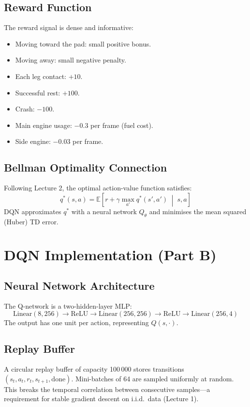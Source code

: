\documentclass[11pt,a4paper]{article}
\begin{document}
\subsection*{Reward Function}
The reward signal is dense and informative:
\begin{itemize}
  \item Moving toward the pad: small positive bonus.
  \item Moving away: small negative penalty.
  \item Each leg contact: $+10$.
  \item Successful rest: $+100$.
  \item Crash: $-100$.
  \item Main engine usage: $-0.3$ per frame (fuel cost).
  \item Side engine: $-0.03$ per frame.
\end{itemize}

\subsection*{Bellman Optimality Connection}
Following Lecture 2, the optimal action-value function satisfies:
\[
  q^*(s,a) = \mathbb{E}\!\left[r + \gamma \max_{a'} q^*(s',a') \;\middle|\; s,a\right]
\]
DQN approximates $q^*$ with a neural network $Q_\theta$ and minimises
the mean squared (Huber) TD error.

\section{DQN Implementation (Part B)}

\subsection{Neural Network Architecture}
The Q-network is a two-hidden-layer MLP:
\[
  \text{Linear}(8,256) \to \text{ReLU} \to \text{Linear}(256,256) \to
  \text{ReLU} \to \text{Linear}(256,4)
\]
The output has one unit per action, representing $Q(s,\cdot)$.

\subsection{Replay Buffer}
A circular replay buffer of capacity 100\,000 stores transitions
$(s_t,a_t,r_t,s_{t+1},\text{done})$.  Mini-batches of 64 are sampled
uniformly at random.  This breaks the temporal correlation between
consecutive samples—a requirement for stable gradient descent on
i.i.d.\ data (Lecture 1).
\end{document}
